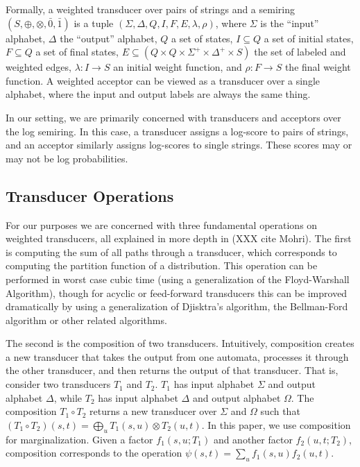 \documentclass[11pt,a4paper]{article}
\begin{document}
Formally, a weighted transducer over pairs of strings and a semiring
$(S,\oplus,\otimes,\bar 0, \bar 1)$ is a tuple
$(\Sigma,\Delta,Q,I,F,E,\lambda,\rho)$, where $\Sigma$ is the
``input'' alphabet, $\Delta$ the ``output'' alphabet, $Q$ a set of
states, $I \subseteq Q$ a set of initial states, $F \subseteq Q$ a
set of final states, $E \subseteq (Q \times Q \times \Sigma^+ \times
\Delta^+ \times S)$ the set of labeled and weighted edges, $\lambda:
I \rightarrow S$ an initial weight function, and $\rho: F \rightarrow
S$ the final weight function. A weighted acceptor can be viewed as
a transducer over a single alphabet, where the input and output
labels are always the same thing.

In our setting, we are primarily concerned with transducers and
acceptors over the log semiring. In this case, a transducer assigns
a log-score to pairs of strings, and an acceptor similarly assigns
log-scores to single strings. These scores may or may not be
log probabilities.

\subsection{Transducer Operations}

For our purposes we are concerned with three fundamental operations
on weighted transducers, all explained in more depth in (XXX cite
Mohri). The first is computing the sum of all paths through a
transducer, which corresponds to computing the partition function
of a distribution. This operation can be performed in worst case
cubic time (using a generalization of the Floyd-Warshall Algorithm),
though for acyclic or feed-forward transducers this can be improved
dramatically by using a generalization of Djisktra's algorithm, the
Bellman-Ford algorithm or other related algorithms.

The second is the composition of two transducers. Intuitively,
composition creates a new transducer that takes the output from one
automata, processes it through the other transducer, and then returns
the output of that transducer. That is, consider two transducers
$T_1$ and $T_2$. $T_1$ has input alphabet $\Sigma$ and output
alphabet $\Delta$, while $T_2$ has input alphabet $\Delta$ and
output alphabet $\Omega$. The composition $T_1 \circ T_2$ returns
a new transducer over $\Sigma$ and $\Omega$ such that $(T_1 \circ
T_2)(s,t) = \bigoplus_{u} T_1(s,u)\otimes T_2(u,t)$. In this paper,
we use composition for marginalization. Given a factor $f_1(s,u;T_1)$
and another factor $f_2(u,t;T_2)$, composition corresponds to the
operation $\psi(s,t) = \sum_u f_1(s,u) f_2(u,t)$.
\end{document}
